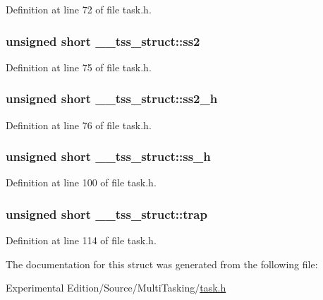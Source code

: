 Definition at line 72 of file task.\+h.

\subsubsection[{\texorpdfstring{ss2}{ss2}}]{\setlength{\rightskip}{0pt plus 5cm}unsigned short \+\_\+\+\_\+tss\+\_\+struct\+::ss2}\hypertarget{struct____tss__struct_a38e2e31267942cf914f1f87e95e06152}{}\label{struct____tss__struct_a38e2e31267942cf914f1f87e95e06152}


Definition at line 75 of file task.\+h.

\subsubsection[{\texorpdfstring{ss2\+\_\+h}{ss2_h}}]{\setlength{\rightskip}{0pt plus 5cm}unsigned short \+\_\+\+\_\+tss\+\_\+struct\+::ss2\+\_\+h}\hypertarget{struct____tss__struct_adef7bc907c882bdf83a27b682583f9cd}{}\label{struct____tss__struct_adef7bc907c882bdf83a27b682583f9cd}


Definition at line 76 of file task.\+h.

\subsubsection[{\texorpdfstring{ss\+\_\+h}{ss_h}}]{\setlength{\rightskip}{0pt plus 5cm}unsigned short \+\_\+\+\_\+tss\+\_\+struct\+::ss\+\_\+h}\hypertarget{struct____tss__struct_a1c717fd639092811a9d4b548d6115b36}{}\label{struct____tss__struct_a1c717fd639092811a9d4b548d6115b36}


Definition at line 100 of file task.\+h.

\subsubsection[{\texorpdfstring{trap}{trap}}]{\setlength{\rightskip}{0pt plus 5cm}unsigned short \+\_\+\+\_\+tss\+\_\+struct\+::trap}\hypertarget{struct____tss__struct_a1bb5da85377e5612cddb13b0ac403e4e}{}\label{struct____tss__struct_a1bb5da85377e5612cddb13b0ac403e4e}


Definition at line 114 of file task.\+h.



The documentation for this struct was generated from the following file\+:\begin{DoxyCompactItemize}
\item 
Experimental Edition/\+Source/\+Multi\+Tasking/\hyperlink{task_8h}{task.\+h}\end{DoxyCompactItemize}
